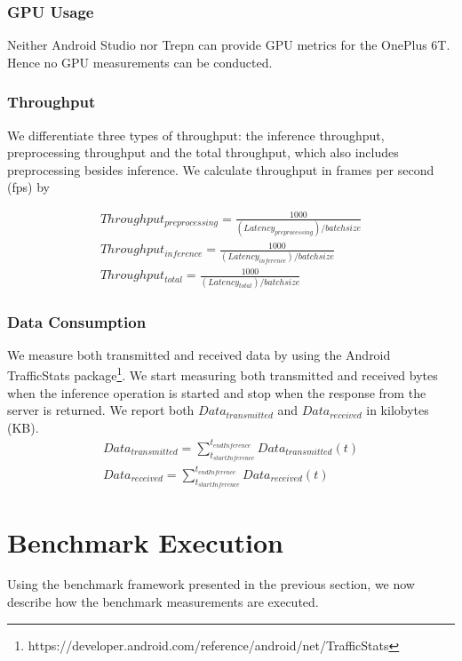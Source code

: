 \subsubsection{GPU Usage}
Neither Android Studio nor Trepn can provide GPU metrics for the OnePlus 6T. Hence no GPU measurements can be conducted.
\subsubsection{Throughput}
We differentiate three types of throughput: the inference throughput, preprocessing throughput and the total throughput, which also includes preprocessing besides inference.
We calculate throughput in frames per second (fps) by 

\begin{equation*}
\begin{gathered}
Throughput_{preprocessing} =\frac{1000}{(Latency_{preprocessing}) / batchsize}\\
Throughput_{inference} =\frac{1000}{(Latency_{inference}) / batchsize}\\
Throughput_{total}  =\frac{1000}{(Latency_{total}) / batchsize}
\end{gathered}
\end{equation*}
\subsubsection{Data Consumption}
We measure both transmitted and received data by using the Android TrafficStats package\footnote{https://developer.android.com/reference/android/net/TrafficStats}. We start measuring both transmitted and received bytes when the inference operation is started and stop when the response from the server is returned. We report both $Data_{transmitted}$ and $Data_{received}$ in kilobytes (KB).
\begin{equation*}
\begin{gathered}
Data_{transmitted} = \sum_{t_{startInference}}^{t_{endInference}} Data_{transmitted}(t)\\
Data_{received} = \sum_{t_{startInference}}^{t_{endInference}} Data_{received}(t)
\end{gathered}
\end{equation*}

\section{Benchmark Execution}
\label{chap:benchmarkExec}
Using the benchmark framework presented in the previous section, we now describe how the benchmark measurements are executed.


